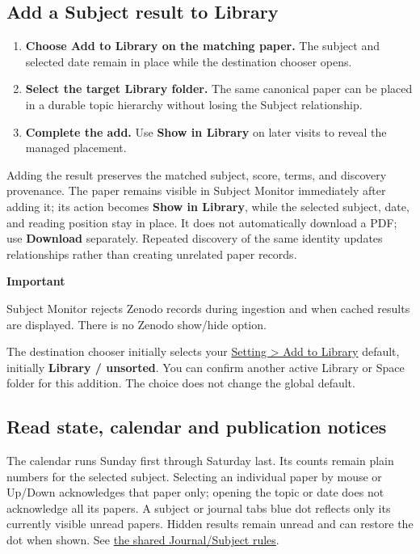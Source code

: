 \documentclass[10pt,letterpaper,oneside]{scrreprt}
\providecommand{\tightlist}{\setlength{\itemsep}{1pt}\setlength{\parskip}{0pt}}
\renewenvironment{quote}
  {\Needspace{5\baselineskip}\begin{tcolorbox}[enhanced,breakable,colback=GewuPale,colframe=GewuPale,boxrule=0pt,
    borderline west={1.6pt}{0pt}{GewuBlue},arc=1.2mm,left=2.5mm,right=2.5mm,top=1.7mm,bottom=1.7mm,
    before skip=4pt,after skip=5pt,fontupper=\color{GewuInk}\small]}
  {\end{tcolorbox}}
\begin{document}
\subsection{Add a Subject result to Library}\label{add-a-subject-result-to-library}

\begin{enumerate}
\tightlist
\item
  \textbf{Choose \textbf{Add to Library} on the matching paper.} The subject and selected date remain in place while the destination chooser opens.
\item
  \textbf{Select the target Library folder.} The same canonical paper can be placed in a durable topic hierarchy without losing the Subject relationship.
\item
  \textbf{Complete the add.} Use \textbf{Show in Library} on later visits to reveal the managed placement.
\end{enumerate}

Adding the result preserves the matched subject, score, terms, and discovery provenance. The paper remains visible in Subject Monitor immediately after adding it; its action becomes \textbf{Show in Library}, while the selected subject, date, and reading position stay in place. It does not automatically download a PDF; use \textbf{Download} separately. Repeated discovery of the same identity updates relationships rather than creating unrelated paper records.

\begin{quote}
\textbf{Important}

Subject Monitor rejects Zenodo records during ingestion and when cached results are displayed. There is no Zenodo show/hide option.
\end{quote}

The destination chooser initially selects your \hyperref[add-to-library-settings]{Setting \textgreater{} Add to Library} default, initially \textbf{Library / unsorted}. You can confirm another active Library or Space folder for this addition. The choice does not change the global default.

\subsection{Read state, calendar and publication notices}\label{read-state-calendar-and-publication-notices}

The calendar runs Sunday first through Saturday last. Its counts remain plain numbers for the selected subject. Selecting an individual paper by mouse or Up/Down acknowledges that paper only; opening the topic or date does not acknowledge all its papers. A subject or journal tab\textquotesingle s blue dot reflects only its currently visible unread papers. Hidden results remain unread and can restore the dot when shown. See \hyperref[monitor-unread]{the shared Journal/Subject rules}.
\end{document}
